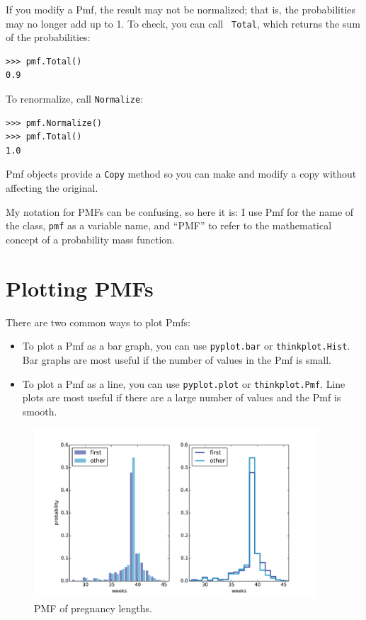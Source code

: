 \documentclass[12pt]{book}
\begin{document}
If you modify a Pmf, the result may not be normalized; that is, the
probabilities may no longer add up to 1.  To check, you can call {\tt
  Total}, which returns the sum of the probabilities:
%
\begin{verbatim}
>>> pmf.Total()
0.9
\end{verbatim}

To renormalize, call {\tt Normalize}:
%
\begin{verbatim}
>>> pmf.Normalize()
>>> pmf.Total()
1.0
\end{verbatim}

Pmf objects provide a {\tt Copy} method so you can make
and modify a copy without affecting the original.

My notation for PMFs can be confusing, so here it is: I use Pmf
for the name of the class, {\tt pmf} as a variable name, and ``PMF''
to refer to the mathematical concept of a probability mass function.


\section{Plotting PMFs}

There are two common ways to plot Pmfs:

\begin{itemize}

\item To plot a Pmf as a bar graph, you can use {\tt pyplot.bar}
or {\tt thinkplot.Hist}.  Bar graphs are most useful if the number
of values in the Pmf is small.

\item To plot a Pmf as a line, you can use {\tt pyplot.plot}
or {\tt thinkplot.Pmf}.  Line plots are most useful if there are
a large number of values and the Pmf is smooth.

\end{itemize}

\begin{figure}
\centerline{\includegraphics[height=2.5in]{figs/probability_nsfg_pmf.pdf}}
\caption{PMF of pregnancy lengths.}
\label{probability_nsfg_pmf}
\end{figure}
\end{document}
